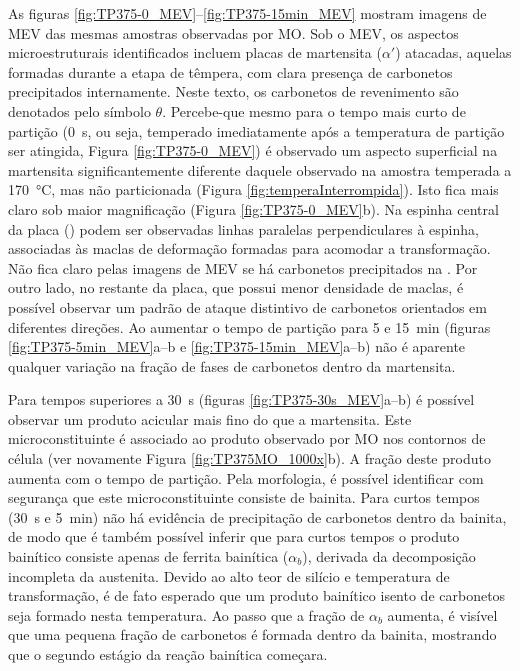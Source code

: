 As figuras \ref{fig:TP375-0_MEV}--\ref{fig:TP375-15min_MEV} mostram imagens de MEV das mesmas amostras observadas por MO.
Sob o MEV, os aspectos microestruturais identificados incluem placas de martensita ($\alpha'$) atacadas, aquelas formadas durante a etapa de têmpera, com clara presença de carbonetos precipitados internamente. Neste texto, os carbonetos de revenimento são denotados pelo símbolo $\theta$. Percebe-que mesmo para o tempo mais curto de partição (0~s, ou seja, temperado imediatamente após a temperatura de partição ser atingida, Figura \ref{fig:TP375-0_MEV}) é observado um aspecto superficial na martensita significantemente diferente daquele observado na amostra temperada a \SI{170}{\degreeCelsius}, mas não particionada (Figura \ref{fig:temperaInterrompida}). Isto fica mais claro sob maior magnificação (Figura \ref{fig:TP375-0_MEV}b). Na espinha central da placa () podem ser observadas linhas paralelas perpendiculares à espinha, associadas às maclas de deformação formadas para acomodar a transformação. Não fica claro pelas imagens de MEV se há carbonetos precipitados na . Por outro lado, no restante da placa, que possui menor densidade de maclas, é possível observar um padrão de ataque distintivo de carbonetos orientados em diferentes direções. Ao aumentar o tempo de partição para 5 e 15~min (figuras \ref{fig:TP375-5min_MEV}a--b e \ref{fig:TP375-15min_MEV}a--b) não é aparente qualquer variação na fração de fases de carbonetos dentro da martensita.

Para tempos superiores a 30~s (figuras \ref{fig:TP375-30s_MEV}a--b) é possível observar um produto acicular mais fino do que a martensita. Este microconstituinte é associado ao produto observado por MO nos contornos de célula (ver novamente Figura \ref{fig:TP375MO_1000x}b). A fração deste produto aumenta com o tempo de partição. Pela morfologia, é possível identificar com segurança que este microconstituinte consiste de bainita. Para curtos tempos (30~s e 5~min) não há evidência de precipitação de carbonetos dentro da bainita, de modo que é também possível inferir que para curtos tempos o produto bainítico consiste apenas de ferrita bainítica ($\alpha_b$), derivada da decomposição incompleta da austenita. Devido ao alto teor de silício e temperatura de transformação, é de fato esperado que um produto bainítico isento de carbonetos seja formado nesta temperatura. Ao passo que a fração de $\alpha_b$ aumenta, é visível que uma pequena fração de carbonetos é formada dentro da bainita, mostrando que o segundo estágio da reação bainítica começara.

